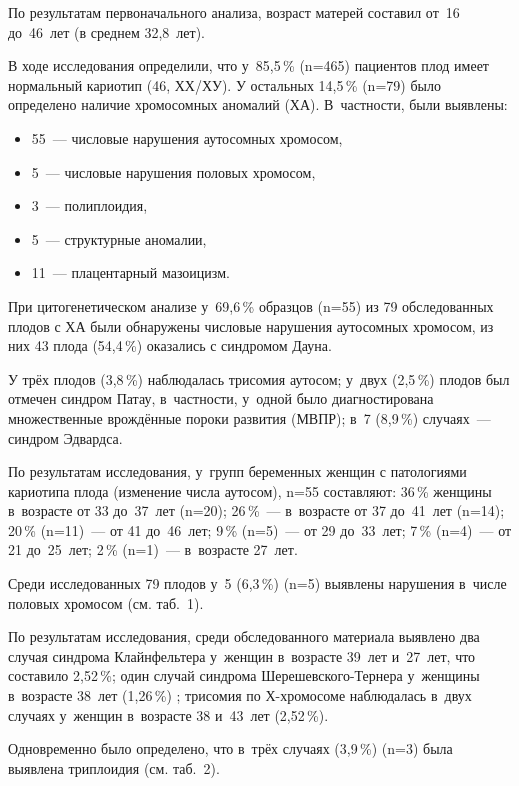 По результатам первоначального анализа, возраст матерей составил от~16 до~46~лет (в среднем 32,8~лет).

В ходе исследования определили, что у~85,5\,\% (n=465) пациентов плод имеет нормальный кариотип (46, ХХ/ХУ). У остальных 14,5\,\% (n=79) было определено наличие хромосомных аномалий (ХА). В~частности, были выявлены:
\begin{itemize}[noitemsep]\vspace{-8pt}
  \item 55~--- числовые нарушения аутосомных хромосом,
\item  5~--- числовые нарушения половых хромосом,
\item  3~--- полиплоидия,
\item  5~--- структурные аномалии,
\item  11~--- плацентарный мазоицизм.
\end{itemize}
\vspace{-8pt}
При цитогенетическом анализе у~69,6\,\% образцов (n=55) из 79 обследованных плодов с ХА были обнаружены числовые нарушения аутосомных хромосом, из них 43 плода (54,4\,\%) оказались с синдромом Дауна.

У трёх плодов (3,8\,\%) наблюдалась трисомия аутосом; у~двух (2,5\,\%) плодов был отмечен синдром Патау, в~частности, у~одной было диагностирована множественные врождённые пороки развития (МВПР); в~7 (8,9\,\%) случаях~--- синдром Эдвардса.

По результатам исследования, у~групп беременных женщин с патологиями кариотипа плода (изменение числа аутосом), n=55 составляют: 36\,\% женщины в~возрасте от 33 до~37~лет (n=20); 26\,\%~--- в~возрасте от 37 до~41~лет (n=14); 20\,\% (n=11)~--- от 41 до~46~лет; 9\,\% (n=5)~--- от 29 до~33~лет; 7\,\% (n=4)~--- от 21 до~25~лет; 2\,\% (n=1)~--- в~возрасте 27~лет.

Среди исследованных 79 плодов у~5 (6,3\,\%) (n=5) выявлены нарушения в~числе половых хромосом (см. таб.~1).



По результатам исследования, среди обследованного материала выявлено два случая синдрома Клайнфельтера у~женщин в~возрасте 39~лет и~27~лет, что составило 2,52\,\%; один случай синдрома Шерешевского-Тернера у~женщины в~возрасте 38~лет (1,26\,\%) ; трисомия по Х-хромосоме наблюдалась в~двух случаях у~женщин в~возрасте 38 и~43~лет (2,52\,\%).

Одновременно было определено, что в~трёх случаях (3,9\,\%) (n=3) была выявлена триплоидия (см. таб.~2).

